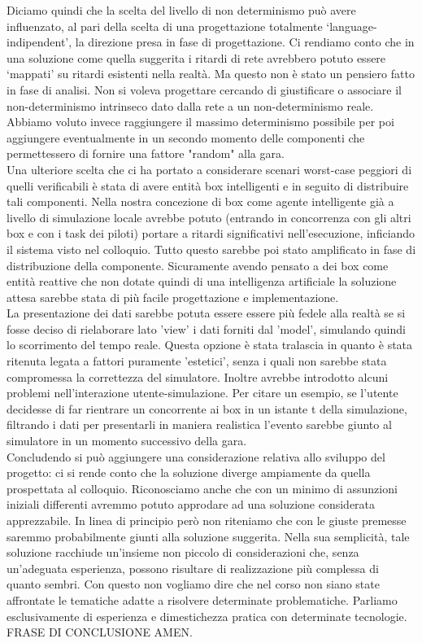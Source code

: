 Diciamo quindi che la scelta del livello di non determinismo può avere influenzato, al pari della scelta di una progettazione totalmente ‘language-indipendent’, la direzione presa in fase di progettazione. Ci rendiamo conto che in una soluzione come quella suggerita i ritardi di rete avrebbero potuto essere ‘mappati’ su ritardi esistenti nella realtà. Ma questo non è stato un pensiero fatto in fase di analisi. Non si voleva progettare cercando di giustificare o associare il non-determinismo intrinseco dato dalla rete a un non-determinismo reale. Abbiamo voluto invece raggiungere il massimo determinismo possibile per poi aggiungere eventualmente in un secondo momento delle componenti che permettessero di fornire una fattore "random" alla gara.\\
Una ulteriore scelta che ci ha portato a considerare scenari worst-case peggiori di quelli verificabili è stata di avere entità box intelligenti e in seguito di distribuire tali componenti. Nella nostra concezione di box come agente intelligente già a livello di simulazione locale avrebbe potuto (entrando in concorrenza con gli altri box e con i task dei piloti) portare a ritardi significativi nell'esecuzione, inficiando il sistema visto nel colloquio. Tutto questo sarebbe poi stato amplificato in fase di distribuzione della componente. Sicuramente avendo pensato a dei box come entità reattive che non dotate quindi di una intelligenza artificiale la soluzione attesa sarebbe stata di più facile progettazione e implementazione.\\
La presentazione dei dati sarebbe potuta essere essere più fedele alla realtà se si fosse deciso di rielaborare lato 'view' i dati forniti dal 'model', simulando quindi lo scorrimento del tempo reale. Questa opzione è stata tralascia in quanto è stata ritenuta legata a fattori puramente 'estetici', senza i quali non sarebbe stata compromessa la correttezza del simulatore. Inoltre avrebbe introdotto alcuni problemi nell'interazione utente-simulazione. Per citare un esempio, se l'utente decidesse di far rientrare un concorrente ai box in un istante t della simulazione, filtrando i dati per presentarli in maniera realistica l'evento sarebbe giunto al simulatore in un momento successivo della gara.\\
Concludendo si può aggiungere una considerazione relativa allo sviluppo del progetto: ci si rende conto che la soluzione diverge ampiamente da quella prospettata al colloquio. Riconosciamo anche che con un minimo di assunzioni iniziali differenti avremmo potuto approdare ad una soluzione considerata apprezzabile. In linea di principio però non riteniamo che con le giuste premesse saremmo probabilmente giunti alla soluzione suggerita. Nella sua semplicità, tale soluzione racchiude un'insieme non piccolo di considerazioni che, senza un'adeguata esperienza, possono risultare di realizzazione più complessa di quanto sembri. Con questo non vogliamo dire che nel corso non siano state affrontate le tematiche adatte a risolvere determinate problematiche. Parliamo esclusivamente di esperienza e dimestichezza pratica con determinate tecnologie. 
FRASE DI CONCLUSIONE
AMEN.